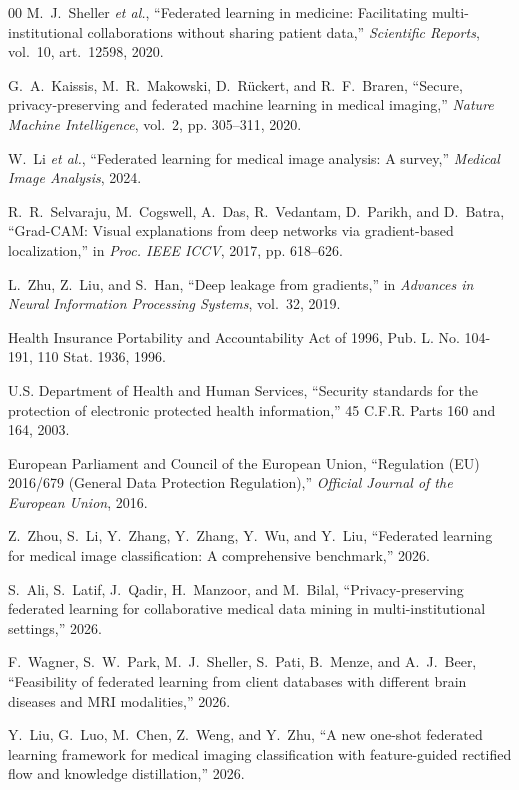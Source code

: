 \documentclass[journal]{IEEEtran}
\begin{document}
\begin{thebibliography}{00}
M.~J.~Sheller \textit{et al.}, ``Federated learning in medicine: Facilitating multi-institutional collaborations without sharing patient data,'' \textit{Scientific Reports}, vol.~10, art.~12598, 2020.

G.~A.~Kaissis, M.~R.~Makowski, D.~R\"uckert, and R.~F.~Braren, ``Secure, privacy-preserving and federated machine learning in medical imaging,'' \textit{Nature Machine Intelligence}, vol.~2, pp. 305--311, 2020.

W.~Li \textit{et al.}, ``Federated learning for medical image analysis: A survey,'' \textit{Medical Image Analysis}, 2024.

R.~R.~Selvaraju, M.~Cogswell, A.~Das, R.~Vedantam, D.~Parikh, and D.~Batra, ``Grad-CAM: Visual explanations from deep networks via gradient-based localization,'' in \textit{Proc. IEEE ICCV}, 2017, pp. 618--626.

L.~Zhu, Z.~Liu, and S.~Han, ``Deep leakage from gradients,'' in \textit{Advances in Neural Information Processing Systems}, vol.~32, 2019.

Health Insurance Portability and Accountability Act of 1996, Pub. L. No. 104-191, 110 Stat. 1936, 1996.

U.S. Department of Health and Human Services, ``Security standards for the protection of electronic protected health information,'' 45 C.F.R. Parts 160 and 164, 2003.

European Parliament and Council of the European Union, ``Regulation (EU) 2016/679 (General Data Protection Regulation),'' \textit{Official Journal of the European Union}, 2016.

Z.~Zhou, S.~Li, Y.~Zhang, Y.~Zhang, Y.~Wu, and Y.~Liu, ``Federated learning for medical image classification: A comprehensive benchmark,'' 2026.

S.~Ali, S.~Latif, J.~Qadir, H.~Manzoor, and M.~Bilal, ``Privacy-preserving federated learning for collaborative medical data mining in multi-institutional settings,'' 2026.

F.~Wagner, S.~W.~Park, M.~J.~Sheller, S.~Pati, B.~Menze, and A.~J.~Beer, ``Feasibility of federated learning from client databases with different brain diseases and MRI modalities,'' 2026.

Y.~Liu, G.~Luo, M.~Chen, Z.~Weng, and Y.~Zhu, ``A new one-shot federated learning framework for medical imaging classification with feature-guided rectified flow and knowledge distillation,'' 2026.


\end{thebibliography}
\end{document}
